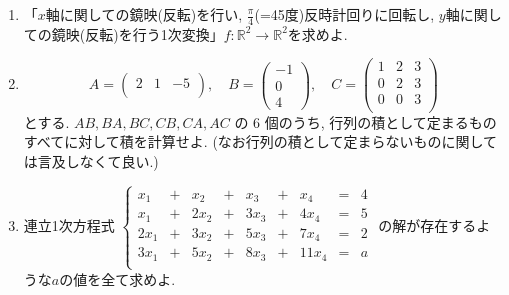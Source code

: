 \documentclass[dvipdfmx,a4paper,11pt]{article}
\newcommand{\R}{\mathbb{R}}
\theoremstyle{definition}
\begin{document}
  
  \begin{enumerate}[label={\Large \textbf{第}\arabic*\textbf{問}.}]


\item   「$x$軸に関しての鏡映(反転)を行い, $\frac{\pi}{4}$(=45度)反時計回りに回転し, $y$軸に関しての鏡映(反転)を行う1次変換」$f: \R^2 \to \R^2$を求めよ.  

  
\item \[
A=
\begin{pmatrix}
2 & 1 & -5\\
\end{pmatrix},
\quad
B=
\begin{pmatrix}
-1 \\
0 \\
4 
\end{pmatrix},
\quad
C=
\begin{pmatrix}
1 & 2 & 3\\
0 & 2 & 3\\
0 & 0 & 3\\
\end{pmatrix}
\]
とする.
 \(AB, BA, BC, CB, CA, AC\) の \(6\) 個のうち, 行列の積として定まるもの
すべてに対して積を計算せよ. (なお行列の積として定まらないものに関しては言及しなくて良い.)
  




 

\item 連立1次方程式
$
 \left\{ 
\begin{matrix}
x_1& +& x_2 & + &x_3& + &x_4&= & 4\\
x_1&+&2x_2& +&3x_3&+&4x_4&= & 5\\
2x_1	&+ &3x_2& +&5x_3&+&7x_4&=&2 \\
3x_1&+&5x_2& +&8x_3&+&11x_4&= & a\\
\end{matrix}
\right.
 $
 の解が存在するような$a$の値を全て求めよ.



\end{enumerate}
\end{document}
